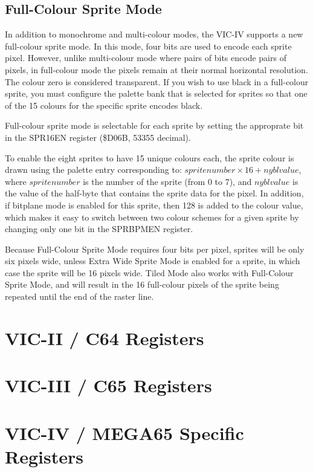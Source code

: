 \subsection{Full-Colour Sprite Mode}

In addition to monochrome and multi-colour modes, the VIC-IV supports a new full-colour sprite mode.  In this mode, four bits are used to
encode each sprite pixel.  However, unlike multi-colour mode where pairs of bits encode pairs of pixels, in full-colour mode the pixels
remain at their normal horizontal resolution.  The colour zero is considered transparent. If you wish to use black in a full-colour sprite, you must configure the palette bank that is selected for sprites so that one of the 15 colours for the specific sprite encodes black.

Full-colour sprite mode is selectable for each sprite by setting the approprate bit in the SPR16EN register (\$D06B, 53355 decimal).

To enable the eight sprites to have 15 unique colours each, the sprite colour is drawn using the palette entry corresponding to:
$sprite number \times 16 + nybl value$, where $sprite number$ is the number of the sprite (from 0 to 7), and $nybl value$ is the value
of the half-byte that contains the sprite data for the pixel.  In addition, if bitplane mode is enabled for this sprite, then 128 is
added to the colour value, which makes it easy to switch between two colour schemes for a given sprite by changing only one bit in the
SPRBPMEN register.  

Because Full-Colour Sprite Mode requires four bits per pixel, sprites will be only six pixels wide, unless Extra Wide Sprite Mode is enabled
for a sprite, in which case the sprite will be 16 pixels wide.  Tiled Mode also works with Full-Colour Sprite Mode, and will result in the
16 full-colour pixels of the sprite being repeated until the end of the raster line.

\section{VIC-II / C64 Registers}



\section{VIC-III / C65 Registers}



\section{VIC-IV / MEGA65 Specific Registers}


